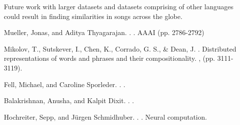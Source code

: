 \documentclass[11pt]{article}
\begin{document}
Future work with larger datasets and datasets comprising of other 
languages could result in finding similarities in songs across the globe. 




%
%
\begin{thebibliography}{}

Mueller, Jonas, and Aditya Thyagarajan.
.
.
\newblock AAAI (pp. 2786-2792)

Mikolov, T., Sutskever, I., Chen, K., Corrado, G. S., \& Dean, J.
.
\newblock Distributed representations of words and phrases and their compositionality.
,
  (pp. 3111-3119).

Fell, Michael, and Caroline Sporleder.
.
.

Balakrishnan, Anusha, and Kalpit Dixit.
.
.

Hochreiter, Sepp, and Jürgen Schmidhuber.
.
.
\newblock Neural computation.

\end{thebibliography}
\end{document}
